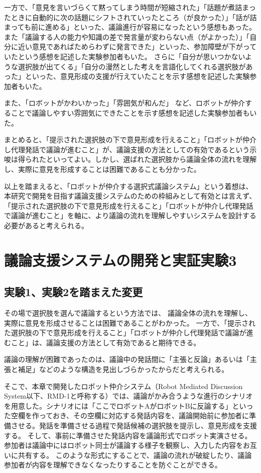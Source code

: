 \documentclass[11pt, a4paper]{jreport} %
\begin{document}
一方で、「意見を言いづらくて黙ってしまう時間が短縮された」「話題が煮詰まったときに自動的に次の話題にシフトされていったところ（が良かった）」「話が詰まっても前に進める」といった、議論進行が容易になったという感想もあった。
また「議論する人の能力や知識の差で発言量が変わらない点（がよかった）」「自分に近い意見であればためらわずに発言できた」といった、参加障壁が下がっていたという感想を記述した実験参加者もいた。
さらに「自分が思いつかないような選択肢が出てくる」「自分の漫然とした考えを言語化してくれる選択肢があった」といった、意見形成の支援が行えていたことを示す感想を記述した実験参加者もいた。


また、「ロボットがかわいかった」「雰囲気が和んだ」%
など、ロボットが仲介することで議論しやすい雰囲気にできたことを示す感想を記述した実験参加者もいた。



まとめると、「提示された選択肢の下で意見形成を行えること」「ロボットが仲介し代理発話で議論が進むこと」が、議論支援の方法としての有効であるという示唆は得られたといってよい。しかし、選ばれた選択肢から議論全体の流れを理解し、実際に意見を形成することは困難であることも分かった。


以上を踏まえると、「ロボットが仲介する選択式議論システム」という着想は、本研究で開発を目指す議論支援システムのための枠組みとして有効とは言えず、「提示された選択肢の下で意見形成を行えること」「ロボットが仲介し代理発話で議論が進むこと」を軸に、より議論の流れを理解しやすいシステムを設計する必要があると考えられる。



\chapter{議論支援システムの開発と実証実験3}


\section{実験1、実験2を踏まえた変更}
\label{sec:tya}
その場で選択肢を選んで議論するという方法では、
議論全体の流れを理解し、実際に意見を形成させることは困難であることがわかった。
一方で、「提示された選択肢の下で意見形成を行えること」「ロボットが仲介し代理発話で議論が進むこと」は、議論支援の方法として有効であると期待できる。


議論の理解が困難であったのは、議論中の発話間に「主張と反論」あるいは「主張と補足」などのような構造を見出しづらかったからだと考えられる。

そこで、本章で開発したロボット仲介システム（Robot Mediated Discussion System以下、RMD-1と呼称する）では、議論がかみ合うような進行のシナリオを用意した。シナリオには「ここでロボットAがロボットBに反論する」といった空欄を作っておき、その空欄に対応する発話内容を、議論開始前に参加者に準備させる。発話を準備させる過程で発話候補の選択肢を提示し、意見形成を支援する。
そして、事前に準備させた発話内容を議論形式でロボット実演させる。参加者は議論中にはロボット同士が議論する様子を観察し、入力した内容をお互いに共有する。
このような形式にすることで、議論の流れが破綻したり、議論参加者が内容を理解できなくなったりすることを防ぐことができる。
\end{document}

